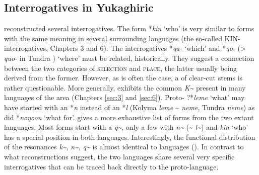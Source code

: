 \subsection{Interrogatives in Yukaghiric}\label{sec:5.14.3}

\cite{Nikolaeva2006} reconstructed several  interrogatives. The form *\textit{kin} ‘who’ is very similar to forms with the same meaning in several surrounding languages (the so-called KIN-interrogatives, Chapters 3 and 6). The interrogatives *\textit{qa-} ‘which’ and *\textit{qo-} (> \textit{quo-} in Tundra ) ‘where’ must be related, historically. They suggest a connection between the two categories of \textsc{selection} and \textsc{place}, the latter usually being derived from the former. However, as is often the case, a  of clear-cut  stems is rather questionable. More generally,  exhibits the common \textit{K{\textasciitilde}}  present in many languages of the area (Chapters \ref{sec:3} and \ref{sec:6}). Proto- ?*\textit{leme} ‘what’ may have started with an *\textit{n} instead of an *\textit{l} (Kolyma  \textit{leme} {\textasciitilde} \textit{neme}, Tundra  \textit{neme}) as did *\textit{noŋoon} ‘what for’.  gives a more exhaustive list of forms from the two extant  languages. Most forms start with a \textit{q{\textasciitilde}}, only a few with \textit{n{\textasciitilde}} ({\textasciitilde} \textit{l{\textasciitilde}}) and \textit{kin} ‘who’ has a special position in both languages. Interestingly, the functional distribution of the resonances \textit{k{\textasciitilde}}, \textit{n{\textasciitilde}}, \textit{q\textasciitilde} is almost identical to  languages (). In contrast to what  reconstructions suggest, the two  languages share several very specific interrogatives that can be traced back directly to the proto-language.

